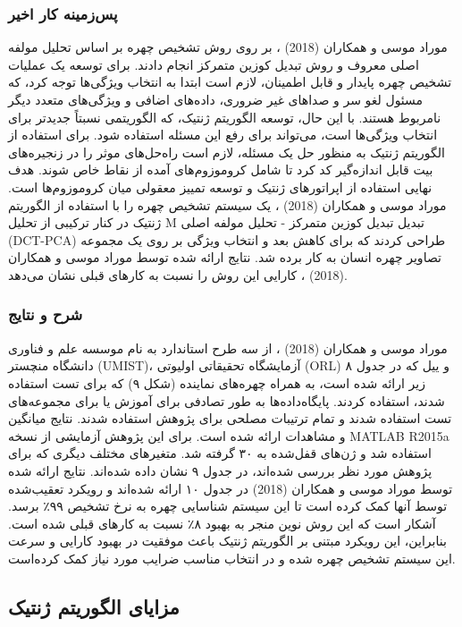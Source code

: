 \documentclass{CSICC2020}
\begin{document}
\subsubsection{پس‌زمینه کار اخیر}
موراد موسی و همکاران (2018) ، بر روی روش تشخیص چهره بر اساس تحلیل مولفه اصلی معروف و روش تبدیل کوزین متمرکز انجام دادند. برای توسعه یک عملیات تشخیص چهره پایدار و قابل اطمینان، لازم است ابتدا به انتخاب ویژگی‌ها توجه کرد، که مسئول لغو سر و صداهای غیر ضروری، داده‌های اضافی و ویژگی‌های متعدد دیگر نامربوط هستند. با این حال، توسعه الگوریتم ژنتیک، که الگوریتمی نسبتاً جدیدتر برای انتخاب ویژگی‌ها است، می‌تواند برای رفع این مسئله استفاده شود. برای استفاده از الگوریتم ژنتیک به منظور حل یک مسئله، لازم است راه‌حل‌های موثر را در زنجیره‌های بیت قابل اندازه‌گیر کد کرد تا شامل کروموزوم‌های آمده از نقاط خاص شوند. هدف نهایی استفاده از اپراتورهای ژنتیک و توسعه تمییز معقولی میان کروموزوم‌ها است. موراد موسی و همکاران (2018) ، یک سیستم تشخیص چهره را با استفاده از الگوریتم ژنتیک در کنار ترکیبی از تحلیل M تبدیل تبدیل کوزین متمرکز - تحلیل مولفه اصلی (DCT-PCA) طراحی کردند که برای کاهش بعد و انتخاب ویژگی بر روی یک مجموعه تصاویر چهره انسان به کار برده شد. نتایج ارائه شده توسط موراد موسی و همکاران (2018) ، کارایی این روش را نسبت به کارهای قبلی نشان می‌دهد. 

\subsubsection{شرح و نتایج  }
موراد موسی و همکاران (2018) ، از سه طرح استاندارد به نام موسسه علم و فناوری دانشگاه منچستر (UMIST)، آزمایشگاه تحقیقاتی اولیوتی (ORL) و ییل که در جدول ۸ زیر ارائه شده است، به همراه چهره‌های نماینده (شکل ۹) که برای تست استفاده شدند، استفاده کردند. پایگاه‌داده‌ها به طور تصادفی برای آموزش یا برای مجموعه‌های تست استفاده شدند و تمام ترتیبات مصلحی برای پژوهش استفاده شدند. نتایج میانگین و مشاهدات ارائه شده است. برای این پژوهش آزمایشی از نسخه MATLAB R2015a استفاده شد و ژن‌های قفل‌شده به ۳۰ گرفته شد. متغیرهای مختلف دیگری که برای پژوهش مورد نظر بررسی شده‌اند، در جدول ۹ نشان داده شده‌اند. 
نتایج ارائه شده توسط موراد موسی و همکاران (2018) در جدول ۱۰ ارائه شده‌اند و رویکرد تعقیب‌شده توسط آنها کمک کرده است تا این سیستم شناسایی چهره به نرخ تشخیص ۹۹٪ برسد. آشکار است که این روش نوین منجر به بهبود ۸٪ نسبت به کارهای قبلی شده است. بنابراین، این رویکرد مبتنی بر الگوریتم ژنتیک باعث موفقیت در بهبود کارایی و سرعت این سیستم تشخیص چهره شده و در انتخاب مناسب ضرایب مورد نیاز کمک کرده‌است. 
\subsection{مزایای الگوریتم ژنتیک}
\end{document}
